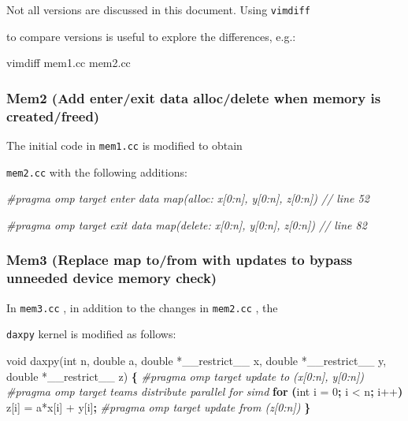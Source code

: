 \documentclass[
]{article}
\let\oldtexttt\texttt
\renewcommand{\texttt}[1]{
  \colorbox{Light}{\oldtexttt{#1}}
}
\newenvironment{Shaded}{}{}
\newcommand{\CommentTok}[1]{\textcolor[rgb]{0.38,0.63,0.69}{\textit{#1}}}
\newcommand{\ExtensionTok}[1]{#1}
\newcommand{\KeywordTok}[1]{\textcolor[rgb]{0.00,0.44,0.13}{\textbf{#1}}}
\newcommand{\NormalTok}[1]{#1}
\newcommand{\OperatorTok}[1]{\textcolor[rgb]{0.40,0.40,0.40}{#1}}
\begin{document}
Not all versions are discussed in this document. Using \texttt{vimdiff}
to compare versions is useful to explore the differences, e.g.:

\begin{Shaded}
\begin{Highlighting}[]
\ExtensionTok{vimdiff}\NormalTok{ mem1.cc mem2.cc}
\end{Highlighting}
\end{Shaded}

\hypertarget{mem2-add-enterexit-data-allocdelete-when-memory-is-createdfreed}{%
\subsubsection{Mem2 (Add enter/exit data alloc/delete when memory is
created/freed)}\label{mem2-add-enterexit-data-allocdelete-when-memory-is-createdfreed}}

The initial code in \texttt{mem1.cc} is modified to obtain
\texttt{mem2.cc} with the following additions:

\begin{Shaded}
\begin{Highlighting}[]
\CommentTok{\#pragma omp target enter data map(alloc: x[0:n], y[0:n], z[0:n]) // line 52}
\end{Highlighting}
\end{Shaded}

\begin{Shaded}
\begin{Highlighting}[]
\CommentTok{\#pragma omp target exit data map(delete: x[0:n], y[0:n], z[0:n]) // line 82}
\end{Highlighting}
\end{Shaded}

\hypertarget{mem3-replace-map-tofrom-with-updates-to-bypass-unneeded-device-memory-check}{%
\subsubsection{Mem3 (Replace map to/from with updates to bypass unneeded
device memory
check)}\label{mem3-replace-map-tofrom-with-updates-to-bypass-unneeded-device-memory-check}}

In \texttt{mem3.cc}, in addition to the changes in \texttt{mem2.cc}, the
\texttt{daxpy} kernel is modified as follows:

\begin{Shaded}
\begin{Highlighting}[]
\ExtensionTok{void}\NormalTok{ daxpy(int n, double a, double *\_\_restrict\_\_ x, double *\_\_restrict\_\_ y, double *\_\_restrict\_\_ z)}
\KeywordTok{\{}
\CommentTok{\#pragma omp target update to (x[0:n], y[0:n])}
\CommentTok{\#pragma omp target teams distribute parallel for simd}
        \KeywordTok{for} \KeywordTok{(}\ExtensionTok{int}\NormalTok{ i = 0}\KeywordTok{;} \ExtensionTok{i} \OperatorTok{\textless{}}\NormalTok{ n}\KeywordTok{;} \ExtensionTok{i++}\KeywordTok{)}
                \ExtensionTok{z}\NormalTok{[i] = a*x[i] + y[i]}\KeywordTok{;}
\CommentTok{\#pragma omp target update from (z[0:n])}
\KeywordTok{\}}
\end{Highlighting}
\end{Shaded}
\end{document}
